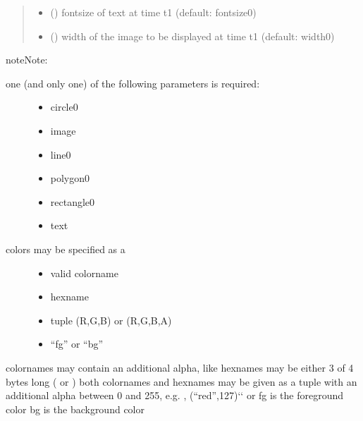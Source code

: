 \documentclass[letterpaper,10pt,english]{sphinxmanual}
\begin{document}
\begin{fulllineitems}
\begin{quote}
\begin{description}
\begin{itemize}
\item {} 
 () \textendash{} fontsize of text at time t1 (default: fontsize0)

\item {} 
 () \textendash{} width of the image to be displayed at time t1 (default: width0) 

\end{itemize}

\end{description}\end{quote}

\begin{sphinxadmonition}{note}{Note:}\begin{description}
\item[{one (and only one) of the following parameters is required:}] \leavevmode\begin{itemize}
\item {} 
circle0

\item {} 
image

\item {} 
line0

\item {} 
polygon0

\item {} 
rectangle0

\item {} 
text

\end{itemize}

\item[{colors may be specified as a}] \leavevmode\begin{itemize}
\item {} 
valid colorname

\item {} 
hexname

\item {} 
tuple (R,G,B) or (R,G,B,A)

\item {} 
“fg” or “bg”

\end{itemize}

\end{description}

colornames may contain an additional alpha, like  
hexnames may be either 3 of 4 bytes long ( or ) 
both colornames and hexnames may be given as a tuple with an
additional alpha between 0 and 255,
e.g. , (“red”,127){}`{}` or  
fg is the foreground color 
bg is the background color 


\end{sphinxadmonition}
\end{fulllineitems}
\end{document}
